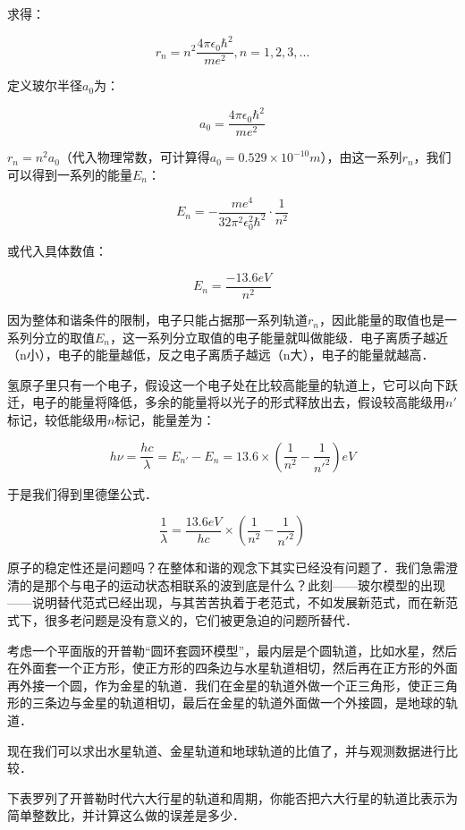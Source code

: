 求得：

\begin{equation}
r_n = n^2 \frac{4 \pi \epsilon_0 \hbar^2  }{ m e^2}, n = 1, 2, 3, ...
\end{equation}

定义玻尔半径$a_0$为：

\begin{equation}
a_0 = \frac{4 \pi \epsilon_0 \hbar^2  }{ m e^2}
\end{equation}

$r_n = n^2 a_0$（代入物理常数，可计算得$a_0 = 0.529 \times 10^{-10} m$），由这一系列$r_n$，我们可以得到一系列的能量$E_n$：

\begin{equation}
E_n = - \frac{m e^4 }{ 32 \pi^2 \epsilon_0^2 \hbar^2 } \cdot {\frac{1}{n^2}}
\end{equation}

或代入具体数值：

\begin{equation}
E_n = \frac{-13.6 eV}{n^2}
\end{equation}

因为整体和谐条件的限制，电子只能占据那一系列轨道$r_n$，因此能量的取值也是一系列分立的取值$E_n$，这一系列分立取值的电子能量就叫做能级．电子离质子越近（n小），电子的能量越低，反之电子离质子越远（n大），电子的能量就越高．

氢原子里只有一个电子，假设这一个电子处在比较高能量的轨道上，它可以向下跃迁，电子的能量将降低，多余的能量将以光子的形式释放出去，假设较高能级用$n'$标记，较低能级用$n$标记，能量差为：

\begin{equation}
h \nu = \frac{hc}{\lambda} = E_{n'} - E_n = 13.6 \times \left( \frac{1}{n^2}  - \frac{1}{n'^2} \right) eV 
\end{equation}

于是我们得到里德堡公式．

\begin{equation}
\frac{1}{\lambda } = \frac{13.6 eV}{hc} \times \left( \frac{1}{n^2}  - \frac{1}{n'^2} \right)
\end{equation}

原子的稳定性还是问题吗？在整体和谐的观念下其实已经没有问题了．我们急需澄清的是那个与电子的运动状态相联系的波到底是什么？此刻——玻尔模型的出现——说明替代范式已经出现，与其苦苦执着于老范式，不如发展新范式，而在新范式下，很多老问题是没有意义的，它们被更急迫的问题所替代．

\begin{exercise}{}
考虑一个平面版的开普勒“圆环套圆环模型”，最内层是个圆轨道，比如水星，然后在外面套一个正方形，使正方形的四条边与水星轨道相切，然后再在正方形的外面再外接一个圆，作为金星的轨道．我们在金星的轨道外做一个正三角形，使正三角形的三条边与金星的轨道相切，最后在金星的轨道外面做一个外接圆，是地球的轨道．

现在我们可以求出水星轨道、金星轨道和地球轨道的比值了，并与观测数据进行比较．
\end{exercise}

\begin{exercise}{}
下表罗列了开普勒时代六大行星的轨道和周期，你能否把六大行星的轨道比表示为简单整数比，并计算这么做的误差是多少．

\end{exercise}